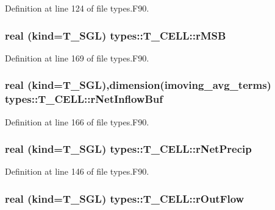 Definition at line 124 of file types.F90.

\hypertarget{typetypes_1_1_t___c_e_l_l_ab4d4f9e552cd62069b44ee3d08f90979}{
\subsubsection[{rMSB}]{\setlength{\rightskip}{0pt plus 5cm}real (kind={\bf T\_\-SGL}) {\bf types::T\_\-CELL::rMSB}}}
\label{typetypes_1_1_t___c_e_l_l_ab4d4f9e552cd62069b44ee3d08f90979}


Definition at line 169 of file types.F90.

\hypertarget{typetypes_1_1_t___c_e_l_l_a6a0a052108e52ad56b2bf59e95d52a64}{
\subsubsection[{rNetInflowBuf}]{\setlength{\rightskip}{0pt plus 5cm}real (kind={\bf T\_\-SGL}),dimension(imoving\_\-avg\_\-terms) {\bf types::T\_\-CELL::rNetInflowBuf}}}
\label{typetypes_1_1_t___c_e_l_l_a6a0a052108e52ad56b2bf59e95d52a64}


Definition at line 166 of file types.F90.

\hypertarget{typetypes_1_1_t___c_e_l_l_a4b867c007a72c8134a3ebf207885c48d}{
\subsubsection[{rNetPrecip}]{\setlength{\rightskip}{0pt plus 5cm}real (kind={\bf T\_\-SGL}) {\bf types::T\_\-CELL::rNetPrecip}}}
\label{typetypes_1_1_t___c_e_l_l_a4b867c007a72c8134a3ebf207885c48d}


Definition at line 146 of file types.F90.

\hypertarget{typetypes_1_1_t___c_e_l_l_ae3d510b213a17293c243a85b6e2eb133}{
\subsubsection[{rOutFlow}]{\setlength{\rightskip}{0pt plus 5cm}real (kind={\bf T\_\-SGL}) {\bf types::T\_\-CELL::rOutFlow}}}
\label{typetypes_1_1_t___c_e_l_l_ae3d510b213a17293c243a85b6e2eb133}


